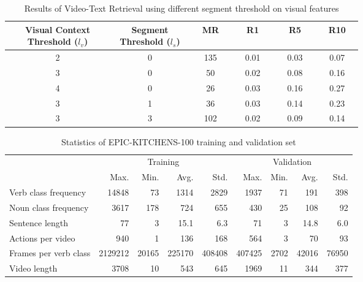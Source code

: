 \begin{table*}[h!]
\begin{minipage}[b]{1\textwidth}
\begin{tabular}
{c{0.2\linewidth}  c{0.15\linewidth} c{0.08\linewidth} c{0.08\linewidth}  c{0.08\linewidth}  c{0.08\linewidth}}
\toprule
Visual Context Threshold ($l_v$) & Segment Threshold ($l_s$) & MR & R1 & R5 & R10 \\
\midrule
2 & 0 & 135 & 0.01 & 0.03 & 0.07 \\
3 & 0 & 50 & 0.02 & 0.08 & 0.16 \\
4 & 0 & 26 & 0.03 & 0.16 & 0.27 \\
3 & 1 & 36 & 0.03 & 0.14 & 0.23 \\
3 & 3 & 102 & 0.02 & 0.09 & 0.14 \\
\bottomrule
\end{tabular}
\caption{Results of Video-Text Retrieval using different segment threshold on visual features}
\label{table:howto100m_visual_seg_threshold}
\end{minipage}
\end{table*}


\begin{table}[ht!]
\begin{minipage}{1\textwidth}
\begin{center}
{\small
\begin{tabular}{lrrrrrrrr}
\toprule
& \multicolumn{4}{c}{Training} & \multicolumn{4}{c}{Validation}\\
~ & Max. & Min. & Avg. & Std. & Max. & Min. & Avg. & Std. \\
\midrule
Verb class frequency & 14848 & 73 & 1314 & 2829 & 1937 & 71 & 191 & 398\\
Noun class frequency & 3617 & 178 & 724 & 655 & 430 & 25 & 108 & 92\\
Sentence length & 77 & 3 & 15.1 & 6.3 & 71 & 3 & 14.8 & 6.0\\
Actions per video & 940 & 1 & 136 & 168 & 564 & 3 & 70 & 93\\
Frames per verb class & 2129212 & 20165 & 225170 & 408408 & 407425 & 2702 & 42016 & 76950 \\
Video length & 3708 & 10 & 543 & 645 & 1969 & 11 & 344 & 377 \\
\bottomrule
\end{tabular}}
\caption{Statistics of EPIC-KITCHENS-100 training and validation set}
\label{table:train_val_stats}
\end{center}
\end{minipage}
\end{table}


